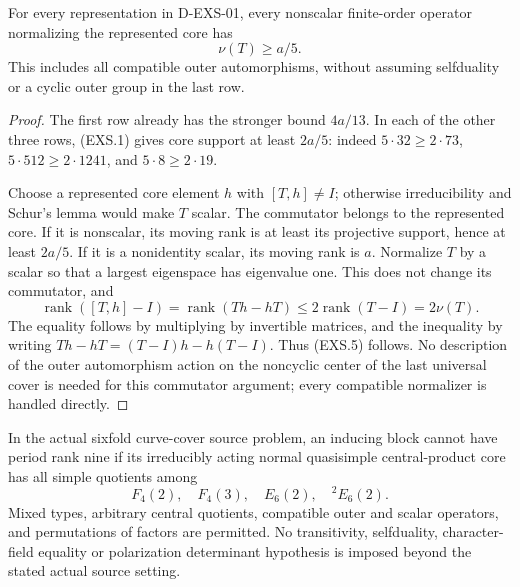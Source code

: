 \begin{lemma}
\label{D-EXS-02}
For every representation in D-EXS-01, every nonscalar finite-order
operator normalizing the represented core has
\[
                              \nu(T)\ge a/5.                   \tag{EXS.5}
\]
This includes all compatible outer automorphisms, without assuming
selfduality or a cyclic outer group in the last row.
\end{lemma}

\begin{proof}
The first row already has the stronger bound $4a/13$.
In each of the other three rows, (EXS.1) gives core support
at least $2a/5$: indeed $5\cdot32\ge2\cdot73$,
$5\cdot512\ge2\cdot1241$, and $5\cdot8\ge2\cdot19$.

Choose a represented core element $h$ with $[T,h]\ne I$;
otherwise irreducibility and Schur's lemma would make $T$ scalar.
The commutator belongs to the represented core. If it is nonscalar,
its moving rank is at least its projective support, hence at least
$2a/5$. If it is a nonidentity scalar, its moving rank is $a$.
Normalize $T$ by a scalar so that a largest eigenspace has eigenvalue
one. This does not change its commutator, and
\[
 \operatorname{rank}([T,h]-I)
   =\operatorname{rank}(Th-hT)
   \le2\operatorname{rank}(T-I)=2\nu(T).                       \tag{EXS.6}
\]
The equality follows by multiplying by invertible matrices, and the
inequality by writing $Th-hT=(T-I)h-h(T-I)$. Thus (EXS.5) follows.
No description of the outer automorphism action on the noncyclic
center of the last universal cover is needed for this commutator
argument; every compatible normalizer is handled directly.
\end{proof}

\begin{theorem}
\label{D-EXS-03}
In the actual sixfold curve-cover source problem, an inducing block
cannot have period rank nine if its irreducibly acting normal
quasisimple central-product core has all simple quotients among
\[
                  F_4(2),\quad F_4(3),\quad E_6(2),
                             \quad {}^2E_6(2).                \tag{EXS.7}
\]
Mixed types, arbitrary central quotients, compatible outer and scalar
operators, and permutations of factors are permitted. No transitivity,
selfduality, character-field equality or polarization determinant
hypothesis is imposed beyond the stated actual source setting.
\end{theorem}

